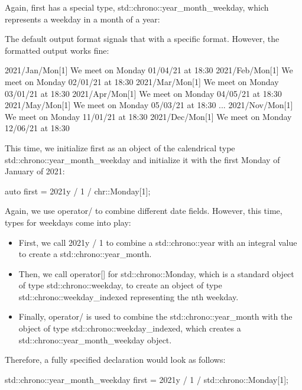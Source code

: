 Again, first has a special type, std::chrono::year\_month\_weekday, which represents a weekday in a month of a year: 

The default output format signals that with a specific format. However, the formatted output works fine:

\begin{shell}
2021/Jan/Mon[1]
 We meet on Monday 01/04/21 at 18:30
2021/Feb/Mon[1]
 We meet on Monday 02/01/21 at 18:30
2021/Mar/Mon[1]
 We meet on Monday 03/01/21 at 18:30
2021/Apr/Mon[1]
 We meet on Monday 04/05/21 at 18:30
2021/May/Mon[1]
 We meet on Monday 05/03/21 at 18:30
...
2021/Nov/Mon[1]
 We meet on Monday 11/01/21 at 18:30
2021/Dec/Mon[1]
 We meet on Monday 12/06/21 at 18:30
\end{shell}


This time, we initialize first as an object of the calendrical type std::chrono::year\_month\_weekday and initialize it with the first Monday of January of 2021:

\begin{shell}
auto first = 2021y / 1 / chr::Monday[1];
\end{shell}

Again, we use operator/ to combine different date fields. However, this time, types for weekdays come into play:

\begin{itemize}
\item 
First, we call 2021y / 1 to combine a std::chrono::year with an integral value to create a std::chrono::year\_month.

\item 
Then, we call operator[] for std::chrono::Monday, which is a standard object of type std::chrono::weekday, to create an object of type std::chrono::weekday\_indexed representing the nth weekday.

\item
Finally, operator/ is used to combine the std::chrono::year\_month with the object of type std::chrono::weekday\_indexed, which creates a std::chrono::year\_month\_weekday object.
\end{itemize}

Therefore, a fully specified declaration would look as follows:

\begin{cpp}
std::chrono::year_month_weekday first = 2021y / 1 / std::chrono::Monday[1];
\end{cpp}


